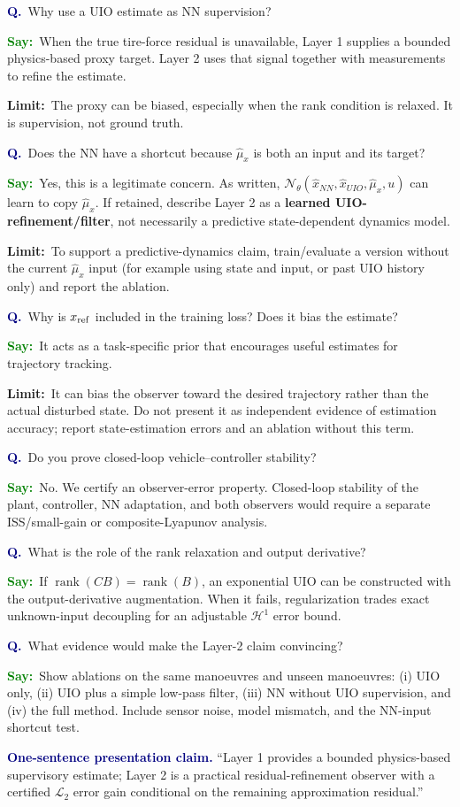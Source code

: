 \documentclass[10pt,a4paper]{article}
\newcommand{\qa}[1]{\vspace{1.2mm}\begin{questionbox}\textcolor{navy}{\textbf{Q.}}\ #1\end{questionbox}}
\newcommand{\say}[1]{\begin{saybox}\textcolor{green}{\textbf{Say:}}\ #1\end{saybox}}
\newcommand{\limit}[1]{\begin{limitbox}\textcolor{amber}{\textbf{Limit:}}\ #1\end{limitbox}}
\begin{document}
\qa{Why use a UIO estimate as NN supervision?}
\say{When the true tire-force residual is unavailable, Layer 1 supplies a bounded physics-based proxy target. Layer 2 uses that signal together with measurements to refine the estimate.}
\limit{The proxy can be biased, especially when the rank condition is relaxed. It is supervision, not ground truth.}

\qa{Does the NN have a shortcut because $\hat\mu_x$ is both an input and its target?}
\say{Yes, this is a legitimate concern. As written, $\mathcal N_\theta(\hat x_{NN},\hat x_{UIO},\hat\mu_x,u)$ can learn to copy $\hat\mu_x$. If retained, describe Layer 2 as a \textbf{learned UIO-refinement/filter}, not necessarily a predictive state-dependent dynamics model.}
\limit{To support a predictive-dynamics claim, train/evaluate a version without the current $\hat\mu_x$ input (for example using state and input, or past UIO history only) and report the ablation.}

\qa{Why is $x_{\rm ref}$ included in the training loss? Does it bias the estimate?}
\say{It acts as a task-specific prior that encourages useful estimates for trajectory tracking.}
\limit{It can bias the observer toward the desired trajectory rather than the actual disturbed state. Do not present it as independent evidence of estimation accuracy; report state-estimation errors and an ablation without this term.}

\qa{Do you prove closed-loop vehicle--controller stability?}
\say{No. We certify an observer-error property. Closed-loop stability of the plant, controller, NN adaptation, and both observers would require a separate ISS/small-gain or composite-Lyapunov analysis.}

\qa{What is the role of the rank relaxation and output derivative?}
\say{If $\operatorname{rank}(CB)=\operatorname{rank}(B)$, an exponential UIO can be constructed with the output-derivative augmentation. When it fails, regularization trades exact unknown-input decoupling for an adjustable $\mathcal H^1$ error bound.}

\qa{What evidence would make the Layer-2 claim convincing?}
\say{Show ablations on the same manoeuvres and unseen manoeuvres: (i) UIO only, (ii) UIO plus a simple low-pass filter, (iii) NN without UIO supervision, and (iv) the full method. Include sensor noise, model mismatch, and the NN-input shortcut test.}

\begin{tcolorbox}[colback=lightblue,colframe=navy,boxrule=.65pt,arc=1.5mm,
  left=3mm,right=3mm,top=2mm,bottom=2mm]
\textcolor{navy}{\textbf{One-sentence presentation claim.}} ``Layer 1 provides a bounded physics-based supervisory estimate; Layer 2 is a practical residual-refinement observer with a certified $\mathcal L_2$ error gain conditional on the remaining approximation residual.''
\end{tcolorbox}
\end{document}
